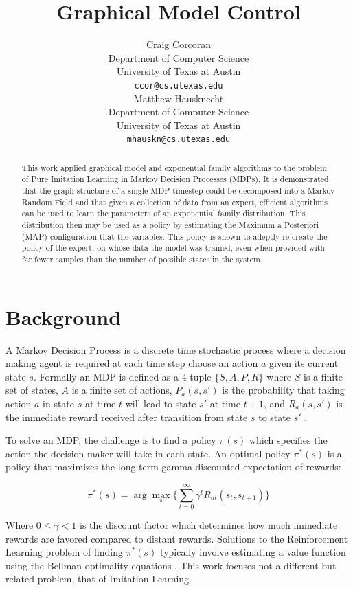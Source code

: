 \documentclass{article} %
\title{Graphical Model Control}
\author{
Craig Corcoran\\
Department of Computer Science\\
University of Texas at Austin\\
\texttt{ccor@cs.utexas.edu} \\
\And
Matthew Hausknecht\\
Department of Computer Science\\
University of Texas at Austin\\
\texttt{mhauskn@cs.utexas.edu} \\
}
\begin{document}
\maketitle

\begin{abstract}
This work applied graphical model and exponential family algorithms to the problem of Pure Imitation Learning in Markov Decision Processes (MDPs). It is demonstrated that the graph structure of a single MDP timestep could be decomposed into a Markov Random Field and that given a collection of data from an expert, efficient algorithms can be used to learn the parameters of an exponential family distribution. This distribution then may be used as a policy by estimating the Maximum a Posteriori (MAP) configuration that the variables. This policy is shown to adeptly re-create the policy of the expert, on whose data the model was trained, even when provided with far fewer samples than the number of possible states in the system.
\end{abstract}

\section{Background}
A Markov Decision Process is a discrete time stochastic process where a decision making agent is required at each time step choose an action $a$ given its current state $s$. Formally an MDP is defined as a 4-tuple $\{S,A,P,R\}$ where $S$ is a finite set of states, $A$ is a finite set of actions, $P_a(s,s')$ is the probability that taking action $a$ in state $s$ at time $t$ will lead to state $s'$ at time $t+1$, and $R_a(s,s')$ is the immediate reward received after transition from state $s$ to state $s'$ \cite{bellman57}.

To solve an MDP, the challenge is to find a policy $\pi(s)$ which specifies the action the decision maker will take in each state. An optimal policy $\pi^*(s)$ is a policy that maximizes the long term gamma discounted expectation of rewards:

\begin{equation}
\label{eqn:opt-policy}
\pi^*(s) = \arg\max_\pi \{\sum_{t=0}^{\infty} \gamma^tR_{at}(s_t,s_{t+1}) \}
\end{equation}

Where $0 \le \gamma < 1$ is the discount factor which determines how much immediate rewards are favored compared to distant rewards. Solutions to the Reinforcement Learning problem of finding $\pi^*(s)$ typically involve estimating a value function using the Bellman optimality equations \cite{sutton98}. This work focuses not a different but related problem, that of Imitation Learning.
\end{document}
